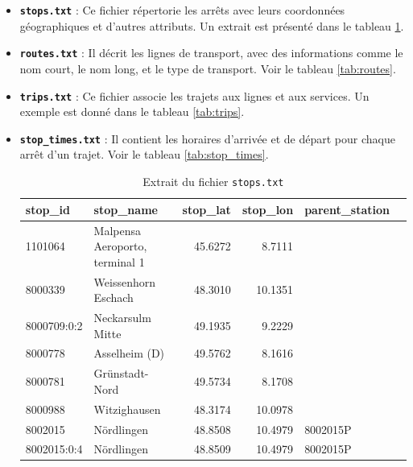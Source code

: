 \begin{itemize}
    \item \textbf{\texttt{stops.txt}} : Ce fichier répertorie les arrêts avec leurs coordonnées géographiques et d’autres attributs. 
    Un extrait est présenté dans le tableau \ref{tab:stops}.
    \item \textbf{\texttt{routes.txt}} : Il décrit les lignes de transport, avec des informations comme le nom court, le nom long, et le type de transport. 
    Voir le tableau \ref{tab:routes}.
    \item \textbf{\texttt{trips.txt}} : Ce fichier associe les trajets aux lignes et aux services.
    Un exemple est donné dans le tableau \ref{tab:trips}.
    \item \textbf{\texttt{stop\_times.txt}} : Il contient les horaires d’arrivée et de départ pour chaque arrêt d’un trajet.
    Voir le tableau \ref{tab:stop_times}.
    \begin{table}[H]
    \caption{Extrait du fichier \texttt{stops.txt}}
    \label{tab:stops}
    \centering
    \begin{tabular}{l l r r l l}
    \toprule
    stop\_id & stop\_name & stop\_lat & stop\_lon  & parent\_station \\
    \midrule
    1101064 & Malpensa Aeroporto, terminal 1 & 45.6272 & 8.7111 & \\
    8000339 & Weissenhorn Eschach & 48.3010 & 10.1351  & \\
    8000709:0:2 & Neckarsulm Mitte & 49.1935 & 9.2229  & \\
    8000778 & Asselheim (D) & 49.5762 & 8.1616  & \\
    8000781 & Grünstadt-Nord & 49.5734 & 8.1708 & \\
    8000988 & Witzighausen & 48.3174 & 10.0978 & \\
    8002015 & Nördlingen & 48.8508 & 10.4979 & 8002015P \\
    8002015:0:4 & Nördlingen & 48.8509 & 10.4979 & 8002015P \\
    \bottomrule
    \end{tabular}
    \end{table}


\end{itemize}
